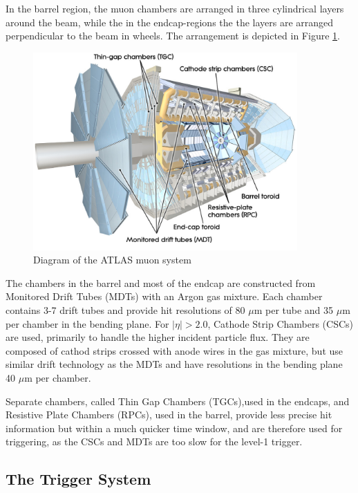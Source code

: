 In the barrel region, the muon chambers are arranged in three cylindrical layers around the beam, while the in the endcap-regions the the layers are arranged perpendicular to the beam in wheels. The arrangement is depicted in Figure \ref{figure:lhc_muon}.

\begin{figure}
\centering 
\includegraphics[width=0.9\textwidth]{figs/lhc/MuonSystem-eps-converted-to}
\caption{Diagram of the ATLAS muon system}
\label{figure:lhc_muon}
\end{figure}

The chambers in the barrel and most of the endcap are constructed from Monitored Drift Tubes (MDTs) with an Argon gas mixture. Each chamber contains 3-7 drift tubes and provide hit resolutions of 80 $\mu$m per tube and 35 $\mu$m per chamber in the bending plane. For $|\eta| > 2.0$, Cathode Strip Chambers (CSCs) are used, primarily to handle the higher incident particle flux. They are composed of cathod strips crossed with anode wires in the gas mixture, but use similar drift technology as the MDTs and have resolutions in the bending plane 40 $\mu$m per chamber. 

Separate chambers, called Thin Gap Chambers (TGCs),used in the endcaps, and Resistive Plate Chambers (RPCs), used in the barrel, provide less precise hit information but within a much quicker time window, and are therefore used for triggering, as the CSCs and MDTs are too slow for the level-1 trigger.


\subsection{The Trigger System} 



